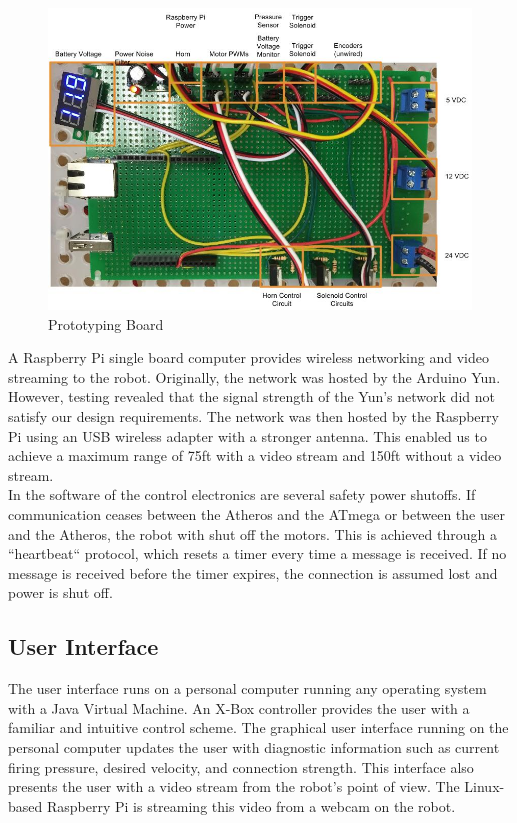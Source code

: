 \documentclass[letterpaper,12pt]{article}
\begin{document}
\begin{figure}[h!]
  \centering
  \includegraphics[width=15cm]{./pics/electronics/AnnotatedProtoboard.jpg}
  \caption{Prototyping Board}
  \label{fig:protoboard_diagram}
\end{figure}

A Raspberry Pi single board computer provides wireless networking and video
streaming to the robot. Originally, the network was hosted by the Arduino Yun.
However, testing revealed that the signal strength of the Yun's network did not
satisfy our design requirements.  The network was then hosted by the Raspberry
Pi using an USB wireless adapter with a stronger antenna. This enabled us to
achieve a maximum range of 75ft with a video stream and 150ft without a video
stream.\\

In the software of the control electronics are several safety power shutoffs.
If communication ceases between the Atheros and the ATmega or between the user
and the Atheros, the robot with shut off the motors. This is achieved through
a “heartbeat“ protocol, which resets a timer every time a message is received.
If no message is received before the timer expires, the connection is assumed
lost and power is shut off.\\

\subsection{User Interface}
The user interface runs on a personal computer running any operating system
with a Java Virtual Machine. An X-Box controller provides the user with
a familiar and intuitive control scheme. The graphical user interface running
on the personal computer updates the user with diagnostic information such as
current firing pressure, desired velocity, and connection strength. This
interface also presents the user with a video stream from the robot’s point of
view. The Linux-based Raspberry Pi is streaming this
video from a webcam on the robot.\\
\end{document}
